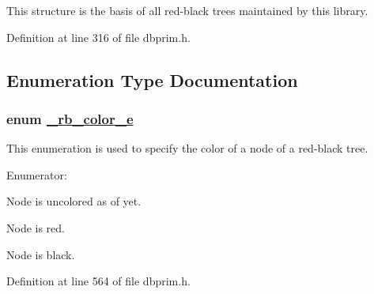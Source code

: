 This structure is the basis of all red-black trees maintained by this library.

Definition at line 316 of file dbprim.h.

\subsection{Enumeration Type Documentation}
\hypertarget{group__dbprim__rbtree_ga53}{
\subsubsection[\_\-rb\_\-color\_\-e]{\setlength{\rightskip}{0pt plus 5cm}enum \hyperlink{group__dbprim__rbtree_ga53}{\_\-rb\_\-color\_\-e}}}
\label{group__dbprim__rbtree_ga53}


This enumeration is used to specify the color of a node of a red-black tree.\begin{Desc}
\item[Enumerator: ]\par
\begin{description}
\item[{\em 
\hypertarget{group__dbprim__rbtree_gga53a139}{
RB\_\-COLOR\_\-NONE}
\label{group__dbprim__rbtree_gga53a139}
}]Node is uncolored as of yet. \item[{\em 
\hypertarget{group__dbprim__rbtree_gga53a140}{
RB\_\-COLOR\_\-RED}
\label{group__dbprim__rbtree_gga53a140}
}]Node is red. \item[{\em 
\hypertarget{group__dbprim__rbtree_gga53a141}{
RB\_\-COLOR\_\-BLACK}
\label{group__dbprim__rbtree_gga53a141}
}]Node is black. \end{description}
\end{Desc}



Definition at line 564 of file dbprim.h.

